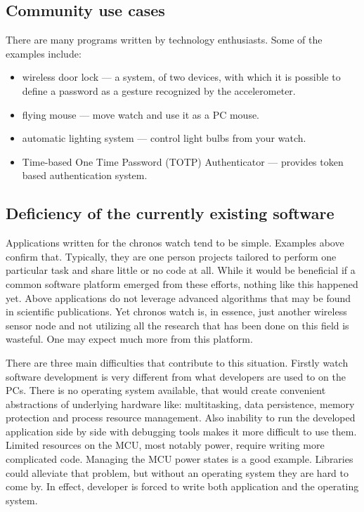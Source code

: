 \subsection{Community use cases}
There are many programs written by technology enthusiasts. Some of the
examples include:

\begin{itemize}
  \item wireless door lock --- a system, of two devices, with which it
    is possible to define a password as a gesture recognized by the
    accelerometer.
  \item flying mouse --- move watch and use it as a PC mouse.
  \item automatic lighting system --- control light bulbs from your
    watch.
  \item Time-based One Time Password (TOTP) Authenticator --- provides
    token based authentication system.
\end{itemize}

\subsection{Deficiency of the currently existing software}

Applications written for the chronos watch tend to be simple. Examples
above confirm that. Typically, they are one person projects tailored to
perform one particular task and share little or no code at all.  While
it would be beneficial if a common software platform emerged from
these efforts, nothing like this happened yet. Above applications do
not leverage advanced algorithms that may be found in scientific
publications. Yet chronos watch is, in essence, just another wireless
sensor node and not utilizing all the research that has been done on
this field is wasteful. One may expect much more from this platform.

There are three main difficulties that contribute to this situation.
Firstly watch software development is very different from what
developers are used to on the PCs. There is no operating system
available, that would create convenient abstractions of underlying
hardware like: multitasking, data persistence, memory protection and
process resource management. Also inability to run the developed
application side by side with debugging tools makes it more difficult
to use them. Limited resources on the MCU, most notably power, require
writing more complicated code. Managing the MCU power states is a good
example. Libraries could alleviate that problem, but without an
operating system they are hard to come by. In effect, developer is
forced to write both application and the operating system.



